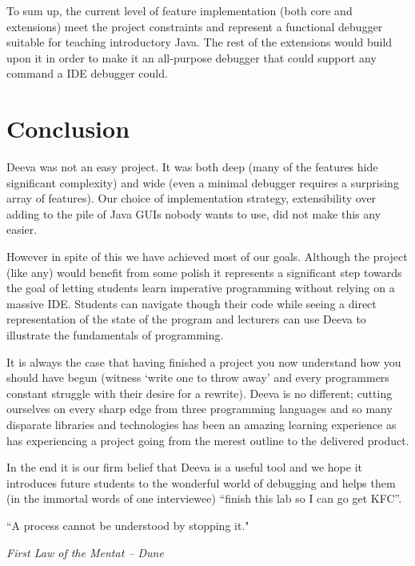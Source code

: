 \documentclass[11pt, a4paper]{article}
\newlength\longest
\begin{document}
To sum up, the current level of feature implementation (both core and extensions) meet the project constraints and represent a functional debugger suitable for teaching introductory Java.
The rest of the extensions would build upon it in order to make it an all-purpose debugger that could support any command a IDE debugger could.



\section{Conclusion}

Deeva was not an easy project.
It was both deep (many of the features hide significant complexity) and wide (even a minimal debugger requires a surprising array of features).
Our choice of implementation strategy, extensibility over adding to the pile of Java GUIs nobody wants to use, did not make this any easier.

However in spite of this we have achieved most of our goals.
Although the project (like any) would benefit from some polish it represents a significant step towards the goal of letting students learn imperative programming without relying on a massive IDE.
Students can navigate though their code while seeing a direct representation of the state of the program and lecturers can use Deeva to illustrate the fundamentals of programming.

It is always the case that having finished a project you now understand how you should have begun (witness `write one to throw away' and every programmers constant struggle with their desire for a rewrite).
Deeva is no different; cutting ourselves on every sharp edge from three programming languages and so many disparate libraries and technologies has been an amazing learning experience as has experiencing a project going from the merest outline to the delivered product.

In the end it is our firm belief that Deeva is a useful tool and we hope it introduces future students to the wonderful world of debugging and helps them (in the immortal words of one interviewee) ``finish this lab so I can go get KFC''.


\clearpage
\thispagestyle{empty}
\null\vfill
\begin{center}
\settowidth{}
\parbox{\longest}{%
  \raggedright{%
  ``A process cannot be understood by stopping it." \\
  }
  \raggedright{\emph{First Law of the Mentat -- Dune}}\par%
}
\end{center}
\vfill\vfill
\clearpage
\end{document}
